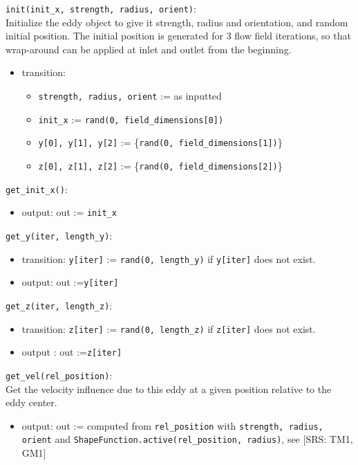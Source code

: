 \documentclass[12pt, titlepage]{article}
\begin{document}
\noindent \texttt{init(init\_x, strength, radius, orient)}:\\
Initialize the eddy object to give it strength, radius and orientation, and random initial position. The initial position is generated for 3 flow field iterations, so that wrap-around can be applied at inlet and outlet from the beginning.
\begin{itemize}
\item transition: 
  \begin{itemize}
  \item \texttt{strength, radius, orient} := as inputted
  \item \texttt{init\_x} := \texttt{rand(0, field\_dimensions[0])}
  \item \texttt{y[0], y[1], y[2]} := \{\texttt{rand(0, field\_dimensions[1])}\}
  \item \texttt{z[0], z[1], z[2]} := \{\texttt{rand(0, field\_dimensions[2])}\}
  \end{itemize}
\end{itemize}

\noindent \texttt{get\_init\_x()}:
\begin{itemize}
  \item output: out := \texttt{init\_x}
\end{itemize}

\noindent \texttt{get\_y(iter, length\_y)}:
\begin{itemize}
  \item transition: \texttt{y[iter]} := \texttt{rand(0, length\_y)} if \texttt{y[iter]} does not exist.
  \item output: out :=\texttt{y[iter]}
\end{itemize}

\noindent \texttt{get\_z(iter, length\_z)}:
\begin{itemize}
  \item transition: \texttt{z[iter]} := \texttt{rand(0, length\_z)} if \texttt{z[iter]} does not exist.
  \item output
  : out :=\texttt{z[iter]}
\end{itemize}
\noindent \texttt{get\_vel(rel\_position)}:\\
Get the velocity influence due to this eddy at a given position relative to the eddy center.
\begin{itemize}
  \item output: out := computed from \texttt{rel\_position} with \texttt{strength, radius, orient} and \texttt{ShapeFunction.active(rel\_position, radius)}, see [SRS: TM1, GM1]
\end{itemize}
\end{document}
